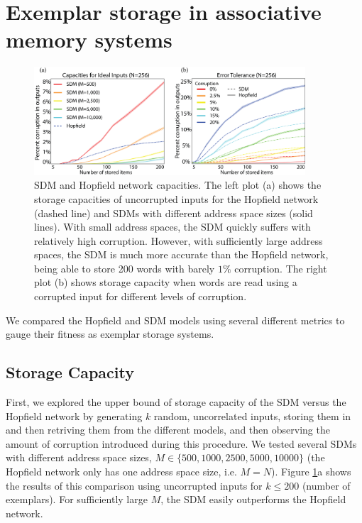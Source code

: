 \documentclass[10pt,letterpaper]{article}
\begin{document}
\section{Exemplar storage in associative memory systems}


\begin{figure}[t!]
  \begin{center}
    \includegraphics[width=0.9\textwidth]{./figures/all-capacities.png}
    \caption{SDM and Hopfield network capacities. The left plot (a)
      shows the storage capacities of uncorrupted inputs for the
      Hopfield network (dashed line) and SDMs with different address
      space sizes (solid lines). With small address spaces, the SDM
      quickly suffers with relatively high corruption. However, with
      sufficiently large address spaces, the SDM is much more accurate
      than the Hopfield network, being able to store 200 words with
      barely $1\%$ corruption. The right plot (b) shows storage
      capacity when words are read using a corrupted input for
      different levels of corruption.}
    \label{fig:capacity}
  \end{center}
\end{figure}

We compared the Hopfield and SDM models using several different
metrics to gauge their fitness as exemplar storage systems.

\subsection{Storage Capacity}

First, we explored the upper bound of storage capacity of the SDM
versus the Hopfield network by generating $k$ random, uncorrelated
inputs, storing them in and then retriving them from the different
models, and then observing the amount of corruption introduced during
this procedure. We tested several SDMs with different address space
sizes, $M\in\{500, 1000, 2500, 5000, 10000\}$ (the Hopfield network
only has one address space size, i.e. $M=N$).  Figure
\ref{fig:capacity}a shows the results of this comparison using
uncorrupted inputs for $k\leq 200$ (number of exemplars). For
sufficiently large $M$, the SDM easily outperforms the Hopfield
network.
\end{document}

